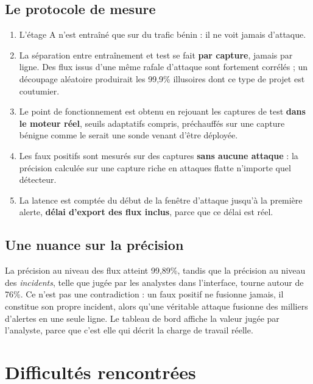 \documentclass[11pt,a4paper]{article}
\begin{document}
\subsection*{Le protocole de mesure}

\begin{enumerate}
\item L'étage A n'est entraîné que sur du trafic bénin : il ne voit jamais d'attaque.
\item La séparation entre entraînement et test se fait \textbf{par capture}, jamais par ligne. Des
flux issus d'une même rafale d'attaque sont fortement corrélés ; un découpage aléatoire produirait
les 99,9\% illusoires dont ce type de projet est coutumier.
\item Le point de fonctionnement est obtenu en rejouant les captures de test \textbf{dans le moteur
réel}, seuils adaptatifs compris, préchauffés sur une capture bénigne comme le serait une sonde
venant d'être déployée.
\item Les faux positifs sont mesurés sur des captures \textbf{sans aucune attaque} : la précision
calculée sur une capture riche en attaques flatte n'importe quel détecteur.
\item La latence est comptée du début de la fenêtre d'attaque jusqu'à la première alerte,
\textbf{délai d'export des flux inclus}, parce que ce délai est réel.
\end{enumerate}

\subsection*{Une nuance sur la précision}

La précision au niveau des flux atteint 99,89\%, tandis que la précision au niveau des
\emph{incidents}, telle que jugée par les analystes dans l'interface, tourne autour de 76\%. Ce
n'est pas une contradiction : un faux positif ne fusionne jamais, il constitue son propre incident,
alors qu'une véritable attaque fusionne des milliers d'alertes en une seule ligne. Le tableau de
bord affiche la valeur jugée par l'analyste, parce que c'est elle qui décrit la charge de travail
réelle.

\section{Difficultés rencontrées}
\end{document}

